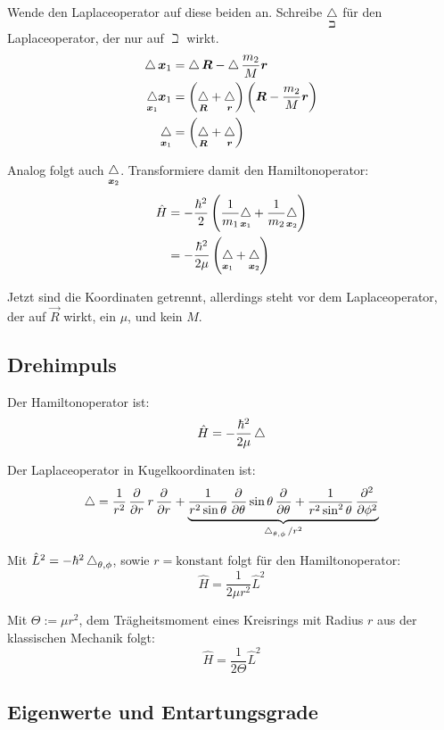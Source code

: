Wende den Laplaceoperator auf diese beiden an. Schreibe $\underset\beth{\operatorname{\bigtriangleup}}$ für den Laplaceoperator, der nur auf $\beth$ wirkt.
\begin{align*}
	\laplace \vec x_1 &= \laplace \vec R - \laplace \frac{m_2}M \vec r \\
	\underset{\vec x_1}\laplace \vec x_1 &= \del{\underset{\vec R}\laplace + \underset{\vec r}\laplace} \del{ \vec R - \frac{m_2}M \vec r} \\
	\underset{\vec x_1}\laplace &= \del{\underset{\vec R}\laplace + \underset{\vec r}\laplace}
\end{align*}

Analog folgt auch $\underset{\boldsymbol{x}_2}{\operatorname{\bigtriangleup}}$. Transformiere damit den
Hamiltonoperator:
\begin{align*}
	\hat H
	&= - \frac{\hbar^2}{2} \del{\frac{1}{m_1} \underset{\vec x_1}\laplace + \frac{1}{m_2} \underset{\vec x_2}\laplace} \\
	&= - \frac{\hbar^2}{2\mu} \del{\underset{\vec x_1}\laplace + \underset{\vec x_2}\laplace}
\end{align*}

Jetzt sind die Koordinaten getrennt, allerdings steht vor dem Laplaceoperator,
der auf $\vec R$ wirkt, ein $\mu$, und kein $M$.

\subsection{Drehimpuls}

Der Hamiltonoperator ist:
\[
	\hat H = - \frac{\hbar^2}{2\mu} \operatorname{\bigtriangleup}
\]

\newcommand\legendrian{\laplace_{\theta,\phi}}

Der Laplaceoperator in Kugelkoordinaten ist:
\[
	\laplace = \frac1{r^2} \dpd{}r r \dpd{}r + \underbrace{\frac1{r^2\sin\theta} \dpd{}\theta \sin\theta \dpd{}\theta + \frac1{r^2\sin^2\theta} \dpd[2]{}\phi}_{\legendrian/r^2}
\]

Mit $\hat L^2 = - \hbar^2 \legendrian$, sowie $r = \text{konstant}$ folgt für
den Hamiltonoperator:
\[
	\hat H = \frac{1}{2\mu r^2} \hat L^2
\]

Mit $\Theta := \mu r^2$, dem Trägheitsmoment eines Kreisrings mit Radius $r$
aus der klassischen Mechanik folgt:
\[
	\hat H = \frac{1}{2\Theta} \hat L^2
\]

\subsection{Eigenwerte und Entartungsgrade}

